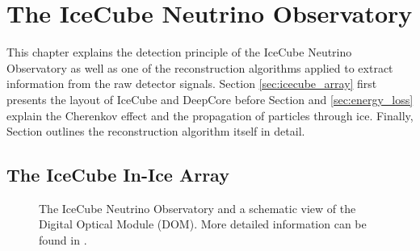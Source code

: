 \setchapterpreamble[u]{\margintoc}

\chapter{The IceCube Neutrino Observatory}


This chapter explains the detection principle of the IceCube Neutrino Observatory as well as one of the reconstruction algorithms applied to extract information from the raw detector signals.
Section \ref{sec:icecube_array} first presents the layout of IceCube and DeepCore before Section  and \ref{sec:energy_loss} explain the Cherenkov effect and the propagation of particles through ice.
Finally, Section  outlines the reconstruction algorithm itself in detail.

\section{The IceCube In-Ice Array} 

\begin{figure}[ht]
	\centering
	\caption[IceCube Neutrino Observatory and Digital Optical Module]{The IceCube Neutrino Observatory and a schematic view of the Digital Optical Module (DOM). More detailed information can be found in \cite{2017JInst..12P3012A_Instrumentation_Systems}.}
\end{figure}

